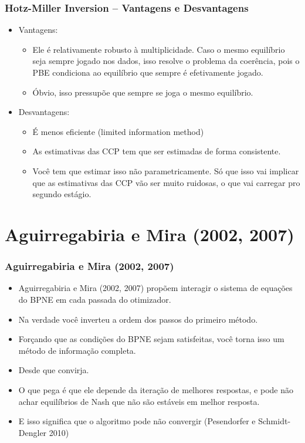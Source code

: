 \documentclass{beamer}
\begin{document}
\begin{frame}[fragile]\frametitle{Hotz-Miller Inversion -- Vantagens e Desvantagens}
\begin{itemize}
	\item Vantagens:
	\begin{itemize}
		\item Ele é relativamente robusto à multiplicidade. Caso o mesmo equilíbrio seja sempre jogado nos dados, isso resolve o problema da coerência, pois o PBE condiciona ao equilíbrio que sempre é efetivamente jogado.
		\item Óbvio, isso pressupõe que sempre se joga o mesmo equilíbrio.
	\end{itemize}
	\item Desvantagens:
	\begin{itemize}
		\item É menos eficiente (limited information method)
		\item As estimativas das CCP tem que ser estimadas de forma consistente.
		\item Você tem que estimar isso não parametricamente. Só que isso vai implicar que as estimativas das CCP vão ser muito ruidosas, o que vai carregar pro segundo estágio.
	\end{itemize}
\end{itemize}
\end{frame}

\section{Aguirregabiria e Mira (2002, 2007)}

\begin{frame}[fragile]\frametitle{Aguirregabiria e Mira (2002, 2007)}
\begin{itemize}
	\item Aguirregabiria e Mira (2002, 2007) propõem interagir o sistema de equações do BPNE em cada passada do otimizador.
	\item Na verdade você inverteu a ordem dos passos do primeiro método.
	\item Forçando que as condições do BPNE sejam satisfeitas, você torna isso um método de informação completa.
	\item Desde que convirja.
	\item O que pega é que ele depende da iteração de melhores respostas, e pode não achar equilíbrios de Nash que não são estáveis em melhor resposta.
	\item E isso significa que o algoritmo pode não convergir (Pesendorfer e Schmidt-Dengler 2010)
\end{itemize}
\end{frame}
\end{document}
